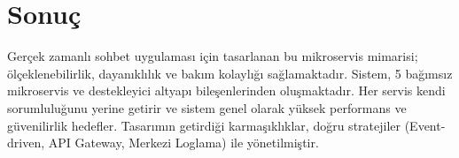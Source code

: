 \section{Sonuç}
Gerçek zamanlı sohbet uygulaması için tasarlanan bu mikroservis mimarisi; ölçeklenebilirlik, dayanıklılık ve bakım kolaylığı sağlamaktadır. Sistem, 5 bağımsız mikroservis ve destekleyici altyapı bileşenlerinden oluşmaktadır. Her servis kendi sorumluluğunu yerine getirir ve sistem genel olarak yüksek performans ve güvenilirlik hedefler. Tasarımın getirdiği karmaşıklıklar, doğru stratejiler (Event-driven, API Gateway, Merkezi Loglama) ile yönetilmiştir.

